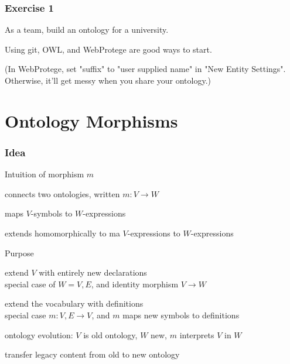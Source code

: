 \begin{frame}\frametitle{Exercise 1}
As a team, build an ontology for a university.

Using git, OWL, and WebProtege are good ways to start.
\bigskip

{\small (In WebProtege, set "suffix" to "user supplied name" in "New Entity Settings". Otherwise, it'll get messy when you share your ontology.)}
\end{frame}

\section{Ontology Morphisms}

\begin{frame}\frametitle{Idea}
\begin{blockitems}{Intuition of morphism $m$}
\item connects two ontologies, written $m:V\to W$
\item maps $V$-symbols to $W$-expressions
\item extends homomorphically to ma $V$-expressions to $W$-expressions
\end{blockitems}

\begin{blockitems}{Purpose}
\item extend $V$ with entirely new declarations \\
  special case of $W=V,E$, and identity morphism $V\to W$
\item extend the vocabulary with definitions \\
   special case $m:V,E\to V$, and $m$ maps new symbols to definitions
\item ontology evolution: $V$ is old ontology, $W$ new, $m$ interprets $V$ in $W$
\item transfer legacy content from old to new ontology
\end{blockitems}
\end{frame}

